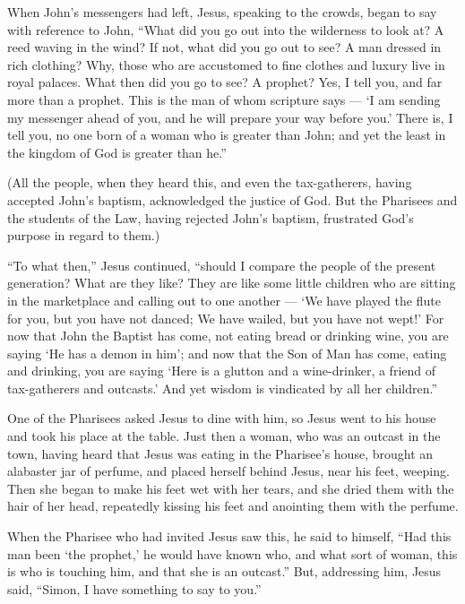  When John's messengers had left, Jesus, speaking to the
crowds, began to say with reference to John,  ``What did
you go out into the wilderness to look at? A reed waving in the wind? If
not, what did you go out to see? A man dressed in rich clothing? Why,
those who are accustomed to fine clothes and luxury live in royal
palaces.  What then did you go to see? A prophet? Yes, I
tell you, and far more than a prophet.  This is the man of
whom scripture says --- `I am sending my messenger ahead of you, and he
will prepare your way before you.'  There is, I tell you,
no one born of a woman who is greater than John; and yet the least in
the kingdom of God is greater than he.''

 (All the people, when they heard this, and even the
tax-gatherers, having accepted John's baptism, acknowledged the justice
of God.  But the Pharisees and the students of the Law,
having rejected John's baptism, frustrated God's purpose in regard to
them.)

 ``To what then,'' Jesus continued, ``should I compare the
people of the present generation? What are they like?  They
are like some little children who are sitting in the marketplace and
calling out to one another --- `We have played the flute for you, but
you have not danced; We have wailed, but you have not wept!'
 For now that John the Baptist has come, not eating bread
or drinking wine, you are saying `He has a demon in him'; 
and now that the Son of Man has come, eating and drinking, you are
saying `Here is a glutton and a wine-drinker, a friend of tax-gatherers
and outcasts.'  And yet wisdom is vindicated by all her
children.''

 One of the Pharisees asked Jesus to dine with him, so
Jesus went to his house and took his place at the table. 
Just then a woman, who was an outcast in the town, having heard that
Jesus was eating in the Pharisee's house, brought an alabaster jar of
perfume,  and placed herself behind Jesus, near his feet,
weeping. Then she began to make his feet wet with her tears, and she
dried them with the hair of her head, repeatedly kissing his feet and
anointing them with the perfume.

 When the Pharisee who had invited Jesus saw this, he said
to himself, ``Had this man been `the prophet,' he would have known who,
and what sort of woman, this is who is touching him, and that she is an
outcast.''  But, addressing him, Jesus said, ``Simon, I
have something to say to you.''

